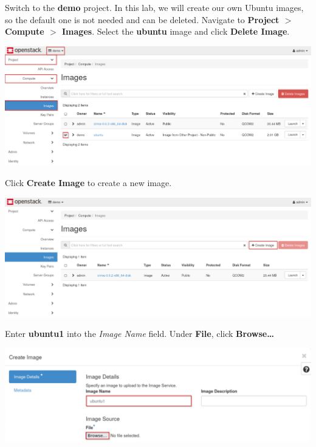 \documentclass[letterpaper, 12pt]{article}
\begin{document}
\begin{enumerate}
    \begin{labstep}
        Switch to the \textbf{demo} project.
        In this lab, we will create our own Ubuntu images, so the default one is not needed and can be deleted.
        Navigate to \textbf{Project $>$ Compute $>$ Images}.
        Select the \textbf{ubuntu} image and click \textbf{Delete Image}.

        \begin{center}
            \includegraphics[width=\linewidth]{images/part1/step4.png}
        \end{center}
    \end{labstep}

    \begin{labstep}
        Click \textbf{Create Image} to create a new image.

        \begin{center}
            \includegraphics[width=\linewidth]{images/part1/step5.png}
        \end{center}
    \end{labstep}

    \begin{labstep}
        Enter \textbf{ubuntu1} into the \textit{Image Name} field.
        Under \textbf{File}, click \textbf{Browse…}

        \begin{center}
            \includegraphics[width=\linewidth]{images/part1/step6.png}
        \end{center}
    \end{labstep}


\end{enumerate}
\end{document}
